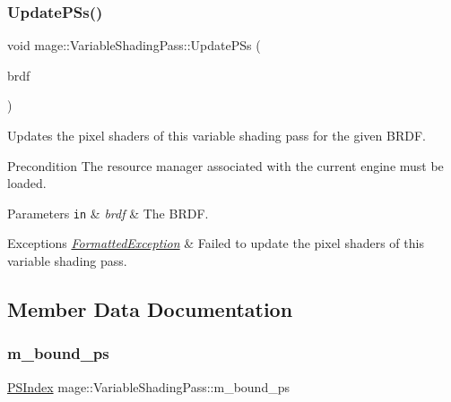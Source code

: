 \subsubsection{\texorpdfstring{Update\+P\+Ss()}{UpdatePSs()}}
{\footnotesize\ttfamily void mage\+::\+Variable\+Shading\+Pass\+::\+Update\+P\+Ss (\begin{DoxyParamCaption}\item[{\hyperlink{namespacemage_ae7a7a03a7b34d7e2689689bb8295cd38}{B\+R\+D\+F\+Type}}]{brdf }\end{DoxyParamCaption})\hspace{0.3cm}{\ttfamily [private]}}

Updates the pixel shaders of this variable shading pass for the given B\+R\+DF.

\begin{DoxyPrecond}{Precondition}
The resource manager associated with the current engine must be loaded. 
\end{DoxyPrecond}

\begin{DoxyParams}[1]{Parameters}
\mbox{\tt in}  & {\em brdf} & The B\+R\+DF. \\
\hline
\end{DoxyParams}

\begin{DoxyExceptions}{Exceptions}
{\em \hyperlink{structmage_1_1_formatted_exception}{Formatted\+Exception}} & Failed to update the pixel shaders of this variable shading pass. \\
\hline
\end{DoxyExceptions}


\subsection{Member Data Documentation}
\hypertarget{classmage_1_1_variable_shading_pass_acb1d0d78a9de9afc2d668d87134c5ec5}{}\label{classmage_1_1_variable_shading_pass_acb1d0d78a9de9afc2d668d87134c5ec5} 
\subsubsection{\texorpdfstring{m\+\_\+bound\+\_\+ps}{m\_bound\_ps}}
{\footnotesize\ttfamily \hyperlink{classmage_1_1_variable_shading_pass_a49519e421ac5be93136d9efdbf075d4a}{P\+S\+Index} mage\+::\+Variable\+Shading\+Pass\+::m\+\_\+bound\+\_\+ps\hspace{0.3cm}{\ttfamily [private]}}

